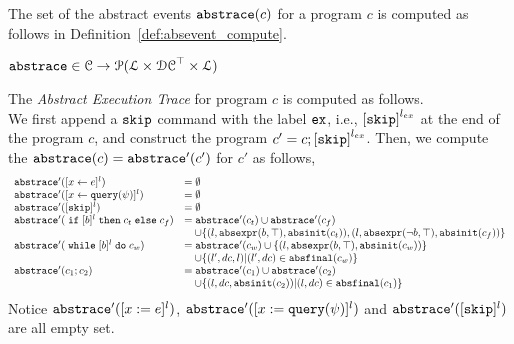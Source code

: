 The set of the abstract events $\mathtt{abs}{\mathtt{trace}}(c)$ for a program $c$
is computed as follows in Definition~\ref{def:absevent_compute}.
 \begin{defn}
 \label{def:absevent_compute}
  $\mathtt{abs}{\mathtt{trace}} \in \mathcal{C} \to \mathcal{P}( \mathcal{L} \times \mathcal{DC}^{\top} \times \mathcal{L} )$
  \end{defn}
 The \emph{Abstract Execution Trace} for program $c$ is computed as follows.
 \\
 We first append a $\mathtt{skip}$ command with 
the label $\mathtt{ex}$, i.e., $\clabel{\eskip}^{l_{ex}}$ at the end of the program $c$, and construct 
the program $c' = c;\clabel{\eskip}^{l_{ex}}$.
Then, we compute the $\mathtt{abs}{\mathtt{trace}}(c) = \mathtt{abs}{\mathtt{trace}}'(c')$ for $c'$ as follows,
 {\footnotesize
 \[
   \begin{array}{ll}
      \absflow'(\clabel{\assign{x}{\expr}}{}^l)  & = \emptyset  \\
      \absflow'(\clabel{\assign{x}{\query(\qexpr)}}{}^l)  & = \emptyset  \\
      \absflow'([\eskip]^{l})  & = \emptyset \\
      \absflow'(\eif [b]^l \ethen c_t \eelse c_f)  & =  \absflow'(c_t) \cup \absflow'(c_f)
        \\ & \quad 
        \cup \{(l, \absexpr(\bexpr, \top),  \absinit(c_t) ) ,  (l, \absexpr(\neg\bexpr, \top), \absinit(c_f)) \} \\
       \absflow'(\ewhile [b]^l \edo c_w)  & =  \absflow'(c_w) \cup \{(l, \absexpr(\bexpr, \top), \absinit(c_w)) \} 
       \\ & \quad 
       \cup \{(l', dc, l)| (l', dc) \in \absfinal(c_w) \} \\
       \absflow'(c_1 ; c_2)  & = \absflow'(c_1) \cup  \absflow'(c_2) 
       \\ & \quad 
       \cup \{ (l, dc, \absinit(c_2)) | (l, dc) \in \absfinal(c_1) \} \\
   \end{array}
   \]
   }
   Notice $\mathtt{abs}{\mathtt{trace}}'([x := e]^{l})$, $\mathtt{abs}{\mathtt{trace}}'([x := {\tt query}(\psi)]^{l})$ and $\mathtt{abs}{\mathtt{trace}}'([\mathtt{skip}]^{l})$ are all empty set. 
